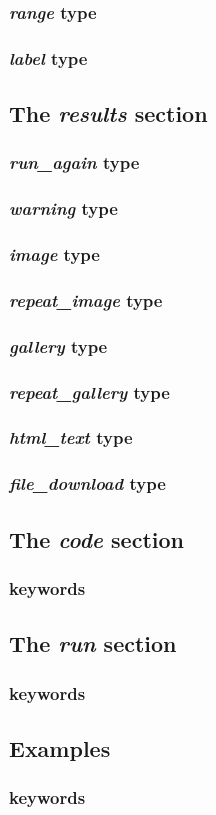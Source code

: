 \subsubsection{ \emph{range} type}
\subsubsection{ \emph{label} type}

\subsection{The \emph{results} section}

\subsubsection{ \emph{run\_again} type}
\subsubsection{ \emph{warning} type}
\subsubsection{ \emph{image} type}
\subsubsection{ \emph{repeat\_image} type}
\subsubsection{ \emph{gallery} type}
\subsubsection{ \emph{repeat\_gallery} type}
\subsubsection{ \emph{html\_text} type}
\subsubsection{ \emph{file\_download} type}

\subsection{The \emph{code} section}
\subsubsection{keywords}

\subsection{The \emph{run} section}
\subsubsection{keywords}

\subsection{Examples}


\subsubsection{keywords}
